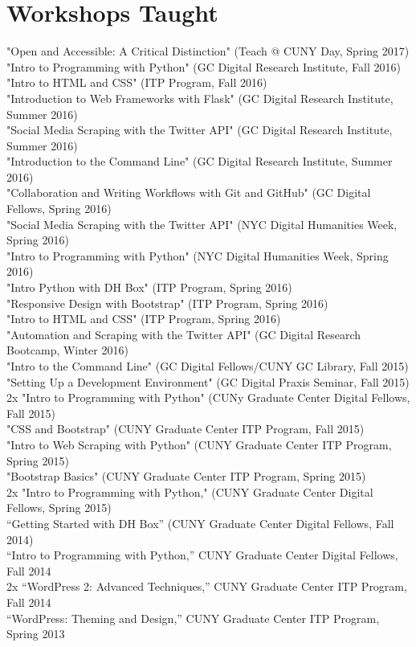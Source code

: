 \documentclass[11pt]{article}
\begin{document}
\section*{Workshops Taught}
\label{sec:orgheadline9}
"Open and Accessible: A Critical Distinction" (Teach @ CUNY Day, Spring 2017)\\
"Intro to Programming with Python" (GC Digital Research Institute, Fall 2016)\\
"Intro to HTML and CSS" (ITP Program, Fall 2016)\\
"Introduction to Web Frameworks with Flask" (GC Digital Research Institute, Summer 2016)\\
"Social Media Scraping with the Twitter API" (GC Digital Research Institute, Summer 2016)\\
"Introduction to the Command Line" (GC Digital Research Institute, Summer 2016)\\
"Collaboration and Writing Workflows with Git and GitHub" (GC Digital Fellows, Spring 2016)\\
"Social Media Scraping with the Twitter API" (NYC Digital Humanities Week, Spring 2016)\\
"Intro to Programming with Python" (NYC Digital Humanities Week, Spring 2016)\\
"Intro Python with DH Box" (ITP Program, Spring 2016)\\
"Responsive Design with Bootstrap" (ITP Program, Spring 2016)\\
"Intro to HTML and CSS" (ITP Program, Spring 2016)\\
"Automation and Scraping with the Twitter API" (GC Digital Research Bootcamp, Winter 2016)\\
"Intro to the Command Line" (GC Digital Fellows/CUNY GC Library, Fall 2015)\\
"Setting Up a Development Environment" (GC Digital Praxis Seminar, Fall 2015)\\
2x "Intro to Programming with Python" (CUNy Graduate Center Digital Fellows, Fall 2015)\\
"CSS and Bootstrap" (CUNY Graduate Center ITP Program, Fall 2015)\\
"Intro to Web Scraping with Python" (CUNY Graduate Center ITP Program, Spring 2015)\\
"Bootstrap Basics" (CUNY Graduate Center ITP Program, Spring 2015)\\
2x "Intro to Programming with Python," (CUNY Graduate Center Digital Fellows, Spring 2015)\\
“Getting Started with DH Box” (CUNY Graduate Center Digital Fellows, Fall 2014)\\
“Intro to Programming with Python,” CUNY Graduate Center Digital Fellows, Fall 2014\\
2x “WordPress 2: Advanced Techniques,” CUNY Graduate Center ITP Program, Fall 2014\\
“WordPress: Theming and Design,” CUNY Graduate Center ITP Program, Spring 2013\\
\end{document}
